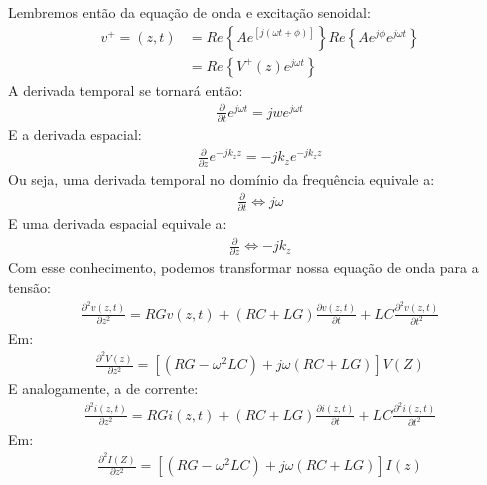 \documentclass[11pt,a4paper]{article}
\begin{document}
Lembremos então da equação de onda e excitação senoidal:
\begin{align*}  
  v^+ = (z,t) &= Re \left\{ A e^{ \left[ j( \omega t+ \phi) \right] } \right\} Re \left\{ A e^{j \phi} e^{j \omega t} \right\}\\
  &= Re \left\{ V^+(z) e^{j \omega t} \right\}
\end{align*}
A derivada temporal se tornará então:
\begin{align*}
  \frac{\partial}{\partial t}e^{j \omega t} = jw e^{j \omega t}
\end{align*}
E a derivada espacial:
\begin{align*}
  \frac{\partial}{\partial z} e^{-jk_z z} = -jk_z e^{-j k_z z}
\end{align*}
Ou seja, uma derivada temporal no domínio da frequência equivale a:
\begin{align*}
  \frac{\partial}{\partial t} \Leftrightarrow j \omega
\end{align*}
E uma derivada espacial equivale a:
\begin{align*}
  \frac{\partial}{\partial z} \Leftrightarrow -j k_z
\end{align*}
Com esse conhecimento, podemos transformar nossa equação de onda para a tensão:
\begin{align*}
  \frac{\partial^2 v(z,t) }{\partial z^2} = RG v(z,t) + (RC+LG) \frac{\partial v(z,t)}{\partial t} + LC \frac{\partial^2 v(z,t)}{\partial t^2}
\end{align*}
Em:
\begin{align}
  \frac{\partial^2 V(z)}{\partial z^2} = \left[ \left( RG - \omega^2 LC \right) + j \omega (RC+LG)  \right]V(Z) \label{eq:5}
\end{align}
E analogamente, a de corrente:
\begin{align*}
  \frac{\partial^2 i(z,t)}{\partial z^2} = RGi(z,t) + (RC+LG) \frac{\partial i(z,t)}{\partial t}+ LC \frac{\partial^2 i(z,t)}{\partial t^2}
\end{align*}
Em:
\begin{align}
  \frac{\partial^2 I(Z)}{\partial z^2}= \left[ \left( RG - \omega^2 LC \right) + j\omega (RC+LG) \right]I(z) \label{eq:6}
\end{align}
\end{document}
